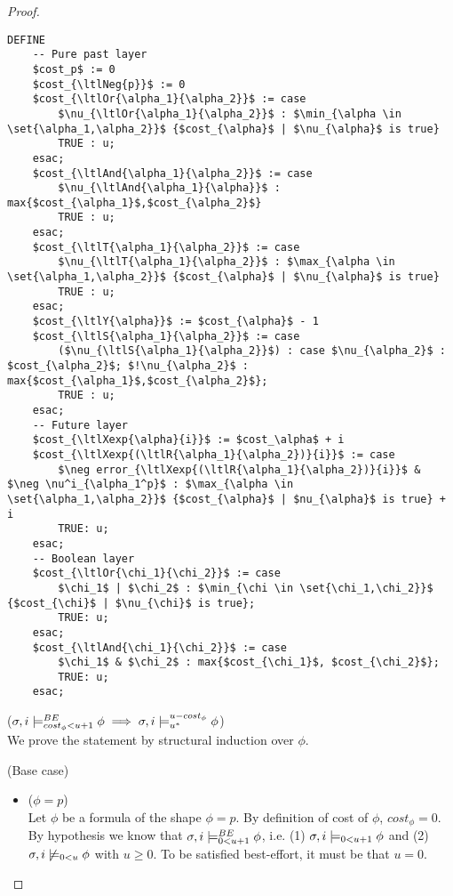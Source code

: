 \begin{theorem}
\begin{proof}
\begin{lstlisting}[language=smv, mathescape=true]
DEFINE
    -- Pure past layer
    $cost_p$ := 0
    $cost_{\ltlNeg{p}}$ := 0
    $cost_{\ltlOr{\alpha_1}{\alpha_2}}$ := case
        $\nu_{\ltlOr{\alpha_1}{\alpha_2}}$ : $\min_{\alpha \in \set{\alpha_1,\alpha_2}}$ {$cost_{\alpha}$ | $\nu_{\alpha}$ is true}
        TRUE : u;
    esac;
    $cost_{\ltlAnd{\alpha_1}{\alpha_2}}$ := case
        $\nu_{\ltlAnd{\alpha_1}{\alpha}}$ : max{$cost_{\alpha_1}$,$cost_{\alpha_2}$}
        TRUE : u;
    esac;
    $cost_{\ltlT{\alpha_1}{\alpha_2}}$ := case
        $\nu_{\ltlT{\alpha_1}{\alpha_2}}$ : $\max_{\alpha \in \set{\alpha_1,\alpha_2}}$ {$cost_{\alpha}$ | $\nu_{\alpha}$ is true}
        TRUE : u;
    esac;
    $cost_{\ltlY{\alpha}}$ := $cost_{\alpha}$ - 1
    $cost_{\ltlS{\alpha_1}{\alpha_2}}$ := case
        ($\nu_{\ltlS{\alpha_1}{\alpha_2}}$) : case $\nu_{\alpha_2}$ : $cost_{\alpha_2}$; $!\nu_{\alpha_2}$ : max{$cost_{\alpha_1}$,$cost_{\alpha_2}$};
        TRUE : u;
    esac;
    -- Future layer
    $cost_{\ltlXexp{\alpha}{i}}$ := $cost_\alpha$ + i
    $cost_{\ltlXexp{(\ltlR{\alpha_1}{\alpha_2})}{i}}$ := case
        $\neg error_{\ltlXexp{(\ltlR{\alpha_1}{\alpha_2})}{i}}$ & $\neg \nu^i_{\alpha_1^p}$ : $\max_{\alpha \in \set{\alpha_1,\alpha_2}}$ {$cost_{\alpha}$ | $nu_{\alpha}$ is true} + i
        TRUE: u;
    esac;
    -- Boolean layer
    $cost_{\ltlOr{\chi_1}{\chi_2}}$ := case
        $\chi_1$ | $\chi_2$ : $\min_{\chi \in \set{\chi_1,\chi_2}}$ {$cost_{\chi}$ | $\nu_{\chi}$ is true};
        TRUE: u;
    esac;
    $cost_{\ltlAnd{\chi_1}{\chi_2}}$ := case
        $\chi_1$ & $\chi_2$ : max{$cost_{\chi_1}$, $cost_{\chi_2}$};
        TRUE: u;
    esac;
\end{lstlisting}

\noindent ($\sigma,i \models_{cost_\phi < u+1}^{BE} \phi \implies \sigma,i \models_{{u}^*}^{u-cost_\phi} \phi$) \\
\noindent We prove the statement by structural induction over $\phi$.

\noindent (Base case)
\begin{itemize}
    \item ($\phi = p$) \\
    Let $\phi$ be a formula of the shape $\phi = p$. 
    By definition of cost of $\phi$, $cost_\phi = 0$.
    By hypothesis we know that $\sigma,i \models_{0 < u+1}^{BE} \phi$, i.e. (1) $\sigma,i \models_{0 < u+1} \phi$ and (2) $\sigma,i \not\models_{0 < u} \phi$ with $u \geq 0$. 
    To be satisfied best-effort, it must be that $u=0$.
    

\end{itemize}
\end{proof}
\end{theorem}
